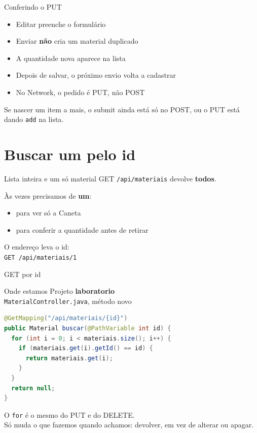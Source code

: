 \documentclass[aspectratio=169,11pt]{beamer}
\newcommand{\onde}[1]{%
  \begin{block}{Onde estamos}
    #1
  \end{block}
}
\begin{document}
\begin{frame}{Conferindo o PUT}
  \begin{itemize}
    \item [ ] Editar preenche o formulário
    \item [ ] Enviar \textbf{não} cria um material duplicado
    \item [ ] A quantidade nova aparece na lista
    \item [ ] Depois de salvar, o próximo envio volta a cadastrar
    \item [ ] No Network, o pedido é PUT, não POST
  \end{itemize}

  \vspace{0.5em}
  Se nascer um item a mais, o submit ainda está só no POST,
  ou o PUT está dando \texttt{add} na lista.
\end{frame}

\section{Buscar um pelo id}

\begin{frame}{Lista inteira e um só material}
  GET \texttt{/api/materiais} devolve \textbf{todos}.

  \vspace{0.5em}
  Às vezes precisamos de \textbf{um}:
  \begin{itemize}
    \item para ver só a Caneta
    \item para conferir a quantidade antes de retirar
  \end{itemize}

  \vspace{0.5em}
  O endereço leva o id:\\
  \texttt{GET /api/materiais/1}
\end{frame}

\begin{frame}[fragile]{GET por id}
  \onde{Projeto \textbf{laboratorio}\\
        \texttt{MaterialController.java}, método novo}

\begin{lstlisting}[language=Java,basicstyle=\ttfamily\footnotesize]
@GetMapping("/api/materiais/{id}")
public Material buscar(@PathVariable int id) {
  for (int i = 0; i < materiais.size(); i++) {
    if (materiais.get(i).getId() == id) {
      return materiais.get(i);
    }
  }
  return null;
}
\end{lstlisting}

  O \texttt{for} é o mesmo do PUT e do DELETE.\\
  Só muda o que fazemos quando achamos: devolver, em vez de
  alterar ou apagar.
\end{frame}
\end{document}
